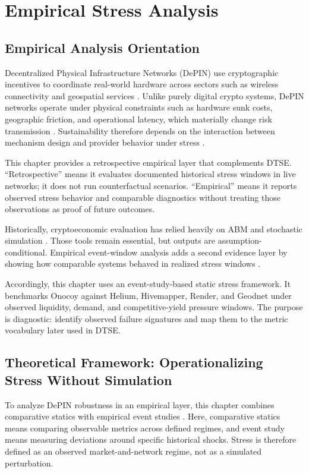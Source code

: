 
\section{Empirical Stress Analysis}
\label{sec:empirical_analysis}

\subsection{Empirical Analysis Orientation}
Decentralized Physical Infrastructure Networks (DePIN) use cryptographic incentives to coordinate real-world hardware across sectors such as wireless connectivity and geospatial services \cite{FrontiersDePIN2025}. Unlike purely digital crypto systems, DePIN networks operate under physical constraints such as hardware sunk costs, geographic friction, and operational latency, which materially change risk transmission \cite{Ballandies2023, Lin2024}. Sustainability therefore depends on the interaction between mechanism design and provider behavior under stress \cite{Chiu2024}.

This chapter provides a retrospective empirical layer that complements DTSE. ``Retrospective'' means it evaluates documented historical stress windows in live networks; it does not run counterfactual scenarios. ``Empirical'' means it reports observed stress behavior and comparable diagnostics without treating those observations as proof of future outcomes.

Historically, cryptoeconomic evaluation has relied heavily on ABM and stochastic simulation \cite{Morris2019, Collins2024}. Those tools remain essential, but outputs are assumption-conditional. Empirical event-window analysis adds a second evidence layer by showing how comparable systems behaved in realized stress windows \cite{MacKinlay1997}.

Accordingly, this chapter uses an event-study-based static stress framework. It benchmarks Onocoy against Helium, Hivemapper, Render, and Geodnet under observed liquidity, demand, and competitive-yield pressure windows. The purpose is diagnostic: identify observed failure signatures and map them to the metric vocabulary later used in DTSE.

\subsection{Theoretical Framework: Operationalizing Stress Without Simulation}
To analyze DePIN robustness in an empirical layer, this chapter combines comparative statics with empirical event studies \cite{MacKinlay1997}. Here, comparative statics means comparing observable metrics across defined regimes, and event study means measuring deviations around specific historical shocks. Stress is therefore defined as an observed market-and-network regime, not as a simulated perturbation.

